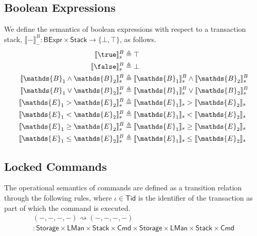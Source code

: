 \subsection{Boolean Expressions}

We define the semantics of boolean expressions with respect to a transaction stack, $\llbracket - \rrbracket_-^B : \mathsf{BExpr} \times \mathsf{Stack} \rightarrow \{ \bot, \top \}$, as follows.
\begin{align*}
\llbracket \true \rrbracket_s^B &\triangleq \top \\
\llbracket \false \rrbracket_s^B &\triangleq \bot \\
\llbracket \mathds{B}_1 \land \mathds{B}_2 \rrbracket_s^B &\triangleq \llbracket \mathds{B}_1 \rrbracket_s^B \land \llbracket \mathds{B}_2 \rrbracket_s^B \\
\llbracket \mathds{B}_1 \lor \mathds{B}_2 \rrbracket_s^B &\triangleq \llbracket \mathds{B}_1 \rrbracket_s^B \lor \llbracket \mathds{B}_2 \rrbracket_s^B \\
\llbracket \mathds{E}_1 > \mathds{E}_2 \rrbracket_s^B &\triangleq \llbracket \mathds{E}_1 \rrbracket_s > \llbracket \mathds{E}_2 \rrbracket_s \\
\llbracket \mathds{E}_1 < \mathds{E}_2 \rrbracket_s^B &\triangleq \llbracket \mathds{E}_1 \rrbracket_s < \llbracket \mathds{E}_2 \rrbracket_s \\
\llbracket \mathds{E}_1 \geq \mathds{E}_2 \rrbracket_s^B &\triangleq \llbracket \mathds{E}_1 \rrbracket_s \geq \llbracket \mathds{E}_2 \rrbracket_s \\
\llbracket \mathds{E}_1 \leq \mathds{E}_2 \rrbracket_s^B &\triangleq \llbracket \mathds{E}_1 \rrbracket_s \leq \llbracket \mathds{E}_2 \rrbracket_s \\
\end{align*}

\subsection{Locked Commands}

The operational semantics of commands are defined as a transition relation through the following rules, where $\iota \in \mathsf{Tid}$ is the identifier of the transaction as part of which the command is executed.
\begin{gather*}
(-, -, -, -) \rightsquigarrow (-, -, -, -) \\
: \mathsf{Storage} \times \mathsf{LMan} \times \mathsf{Stack} \times \mathsf{Cmd} \times \mathsf{Storage} \times \mathsf{LMan} \times \mathsf{Stack} \times \mathsf{Cmd}
\end{gather*}

